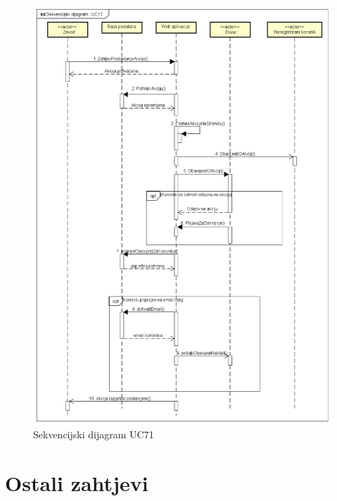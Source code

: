 				\begin{figure}[H]
					\includegraphics[scale=0.4]{slike/Dijagrami/Sekvencijski dijagram - UC17} %
					\centering
					\caption{Sekvencijski dijagram UC71}
					\label{fig:promjene}
				\end{figure}
				\eject
	
		\section{Ostali zahtjevi}
		
